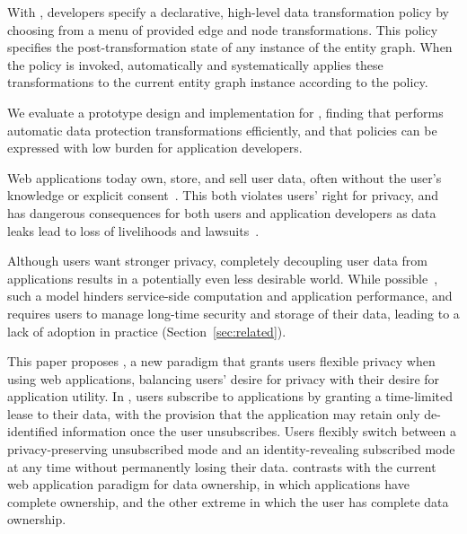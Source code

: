 With \sys, developers specify a declarative, high-level data transformation policy by choosing from a menu of
provided edge and node transformations. This policy specifies the post-transformation state of any instance of the
entity graph. When the policy is invoked, \sys automatically and systematically applies these transformations to the
current entity graph instance according to the policy.

We evaluate a prototype design and implementation for \sys, finding that \sys performs automatic data
protection transformations efficiently, and that policies can be expressed with low burden for application developers.

\iffalse
%
%
Web applications today own, store, and sell user data, often without the user's knowledge or
explicit consent~\cite{nytimes:fb, npr:data}. This both violates users' right for privacy, and has
dangerous consequences for both users and application developers as data leaks lead to loss of
livelihoods and lawsuits~\cite{breach:amazon,breach:twitter, breach:fb, breach:marriott,
breach:quora}. 

Although users want stronger privacy, completely decoupling user data from applications results in a
potentially even less desirable world. While possible~\cite{solid, amber, w5, blockstack, bstore}, such a
model hinders service-side computation and application performance, and requires users to manage
long-time security and storage of their data, leading to a lack of adoption in practice (Section~\ref{sec:related}).  

This paper proposes \name, a new paradigm that grants users flexible privacy when using web
applications, balancing users' desire for privacy with their desire for application utility. In
\name, users subscribe to applications by granting a time-limited lease to their data, with the
provision that the application may retain only de-identified information once the user unsubscribes.
Users flexibly switch between a privacy-preserving unsubscribed mode and an identity-revealing
subscribed mode at any time without permanently losing their data. \name contrasts
with the current web application paradigm for data ownership, in which applications have complete
ownership, and the other extreme in which the user has complete data ownership.%

